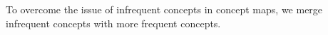 To overcome the issue of infrequent concepts in concept maps, we merge infrequent concepts with more frequent concepts.